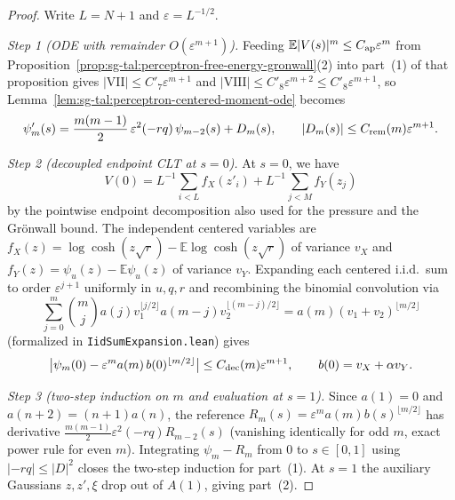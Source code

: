 \begin{proof}
  \leanok
Write $L=N+1$ and $\varepsilon=L^{-1/2}$.

\emph{Step 1 (ODE with remainder $O(\varepsilon^{m+1})$).} Feeding $\mathbb E|V(s)|^m\le C_{\rm ap}\varepsilon^m$
from Proposition~\ref{prop:sg-tal:perceptron-free-energy-gronwall}(2) into part~(1) of that proposition gives
$|\mathrm{VII}|\le C'_7\varepsilon^{m+1}$ and $|\mathrm{VIII}|\le C'_8\varepsilon^{m+2}\le C'_8\varepsilon^{m+1}$, so
Lemma~\ref{lem:sg-tal:perceptron-centered-moment-ode} becomes
\[
 \psi'_m(s)=\frac{m(m-1)}{2}\,\varepsilon^2(-rq)\,\psi_{m-2}(s)+D_m(s),\qquad |D_m(s)|\le C_{\rm rem}(m)\varepsilon^{m+1}.
\]

\emph{Step 2 (decoupled endpoint CLT at $s=0$).} At $s=0$, we have
\[
 V(0)=L^{-1}\sum_{i<L}f_X(z'_i)+L^{-1}\sum_{j<M}f_Y(z_j)
\]
by the pointwise endpoint decomposition also used for the pressure and the Gr\"onwall bound.
The independent centered variables are $f_X(z)=\log\cosh(z\sqrt r)-\mathbb E\log\cosh(z\sqrt r)$ of variance $v_X$
and $f_Y(z)=\psi_u(z)-\mathbb E\psi_u(z)$ of variance $v_Y$. Expanding each centered i.i.d.\ sum to order
$\varepsilon^{j+1}$ uniformly in $u,q,r$ and recombining the binomial convolution via
\[
 \sum_{j=0}^m\binom{m}{j}a(j)v_1^{\lfloor j/2\rfloor}a(m-j)v_2^{\lfloor(m-j)/2\rfloor}
 =a(m)(v_1+v_2)^{\lfloor m/2\rfloor}
\]
(formalized in \texttt{IidSumExpansion.lean}) gives
\[
 \bigl|\psi_m(0)-\varepsilon^m a(m)\,b(0)^{\lfloor m/2\rfloor}\bigr|\le C_{\rm dec}(m)\varepsilon^{m+1},
 \qquad b(0)=v_X+\alpha v_Y .
\]

\emph{Step 3 (two-step induction on $m$ and evaluation at $s=1$).} Since $a(1)=0$ and $a(n+2)=(n+1)a(n)$, the
reference $R_m(s)=\varepsilon^m a(m)b(s)^{\lfloor m/2\rfloor}$ has derivative
$\frac{m(m-1)}{2}\varepsilon^2(-rq)R_{m-2}(s)$ (vanishing identically for odd $m$, exact power rule for even $m$).
Integrating $\psi_m-R_m$ from $0$ to $s\in[0,1]$ using $|{-rq}|\le|D|^2$ closes the two-step induction for
part~(1). At $s=1$ the auxiliary Gaussians $z,z',\xi$ drop out of $A(1)$, giving part~(2).


\end{proof}
